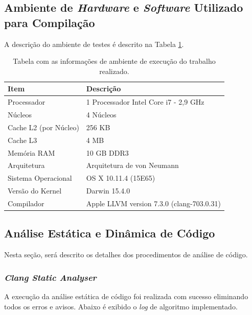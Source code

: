 \documentclass[12pt]{article}
\begin{document}
	\subsection{Ambiente de \textit{Hardware} e \textit{Software} Utilizado para Compilação}

	A descrição do ambiente de testes é descrito na Tabela \ref{tab:arq}.

	\begin{table}[H]
		\caption{Tabela com as informações de ambiente de execução do trabalho realizado.}
		\centering \label{tab:arq}
		\begin{tabular}{l|l}
			\hline
			\textbf{Item}                & \textbf{Descrição} \\ \hline \hline
			Processador         & 1 Processador Intel Core i7 - 2,9 GHz         \\
			Núcleos             & 4 Núcleos \\
			Cache L2 (por Núcleo) & 256 KB \\
			Cache L3            & 4 MB \\
			Memória RAM         & 10 GB DDR3        \\
			Arquitetura         & Arquitetura de von Neumann         \\
			Sistema Operacional & OS X 10.11.4 (15E65)         \\
			Versão do Kernel    & Darwin 15.4.0 \\
			Compilador          & Apple LLVM version 7.3.0 (clang-703.0.31)         \\\hline
		\end{tabular}
	\end{table}

	\subsection{Análise Estática e Dinâmica de Código}
		Nesta seção, será descrito os detalhes dos procedimentos de análise de código.

	\subsubsection{\textit{Clang Static Analyser}}

		A execução da análise estática de código foi realizada com sucesso eliminando todos os erros e avisos. Abaixo é exibido o \textit{log} de algoritmo implementado.
\end{document}
